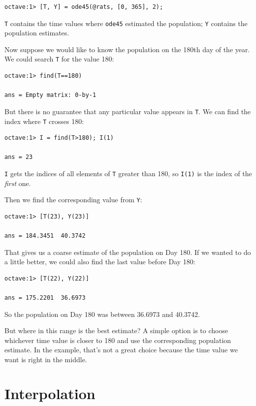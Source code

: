 \documentclass{book}
\begin{document}
\begin{verbatim}
octave:1> [T, Y] = ode45(@rats, [0, 365], 2);
\end{verbatim}

{\tt T} contains the time values where {\tt ode45} estimated the
population; {\tt Y} contains the population estimates.

Now suppose we would like to know the population on the 180th day
of the year. We could search {\tt T} for the value 180:

\begin{verbatim}
octave:1> find(T==180)

ans = Empty matrix: 0-by-1
\end{verbatim}

But there is no guarantee that any particular value appears in
{\tt T}. We can find the index where {\tt T} crosses 180:

\begin{verbatim}
octave:1> I = find(T>180); I(1)

ans = 23
\end{verbatim}

{\tt I} gets the indices of all elements of {\tt T} greater
than 180, so {\tt I(1)} is the index of the {\em first} one.

Then we find the corresponding value from {\tt Y}:

\begin{verbatim}
octave:1> [T(23), Y(23)]

ans = 184.3451  40.3742
\end{verbatim}

That gives us a coarse estimate of the population on Day 180.
If we wanted to do a little better, we could also find the last value
before Day 180:

\begin{verbatim}
octave:1> [T(22), Y(22)]

ans = 175.2201  36.6973
\end{verbatim}

So the population on Day 180 was between 36.6973 and 40.3742.

But where in this range is the best estimate? A simple option is to
choose whichever time value is closer to 180 and use the corresponding
population estimate. In the example, that's not a great choice
because the time value we want is right in the middle.


\section{Interpolation}
\end{document}
